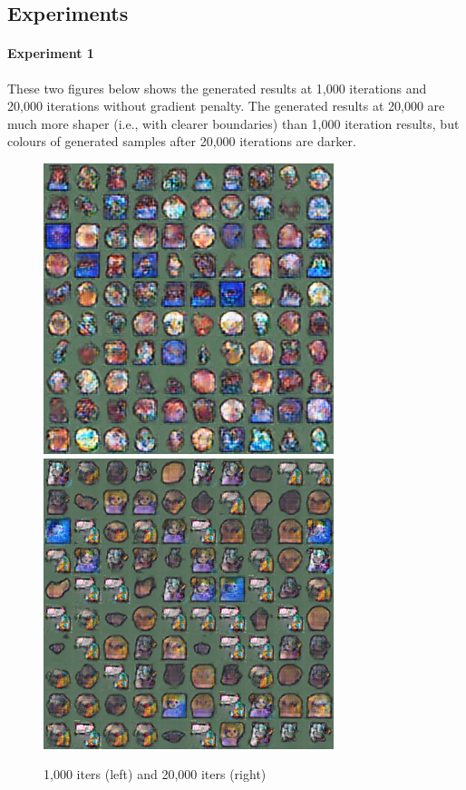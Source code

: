 \documentclass{article}
\begin{document}
	\subsection{Experiments}
	\paragraph{Experiment 1} These two figures below shows the generated results at 1,000 iterations and 20,000 iterations without gradient penalty. The generated results at 20,000 are much more shaper (i.e., with clearer boundaries) than 1,000 iteration results, but colours of generated samples after 20,000 iterations are darker.
	\begin{figure}[H]
		\centering
		\caption{1,000 iters (left) and 20,000 iters (right)}
		\includegraphics[width=0.45\linewidth]{./samples_dcgan_normal/sample-001000.png}
		\includegraphics[width=0.45\linewidth]{./samples_dcgan_normal/sample-020000.png}
		\label{Q1:wo}
	\end{figure}
\end{document}
